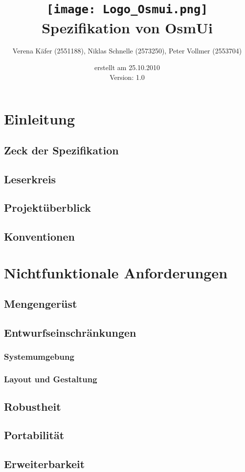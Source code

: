 \documentclass[a4paper,10pt]{scrartcl}
\author{Verena Käfer (2551188), Niklas Schnelle (2573250), Peter Vollmer (2553704)}
\date{erstellt am 25.10.2010\\
Version: 1.0}
\title{\texttt{[image: Logo\_Osmui.png]} \\ 
Spezifikation von OsmUi}
\begin{document}
\maketitle
\newpage
\tableofcontents
\newpage


\section{Einleitung}
\subsection{Zeck der Spezifikation}
\subsection{Leserkreis}
\subsection{Projektüberblick}
\subsection{Konventionen}

\section{Nichtfunktionale Anforderungen}
\subsection{Mengengerüst}
\subsection{Entwurfseinschränkungen}
\subsubsection{Systemumgebung}
\subsubsection{Layout und Gestaltung}
\subsection{Robustheit}
\subsection{Portabilität}
\subsection{Erweiterbarkeit}
\end{document}
